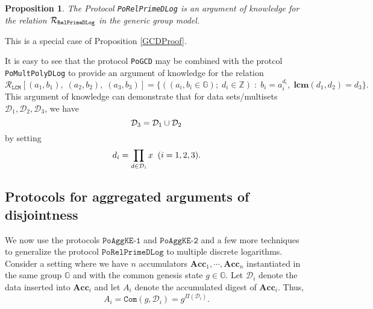 \documentclass[11pt, lettersize, notitlepage, leqno, footskip=0.6cm]{article}
\newcommand{\bz}{\mathbb Z}
\newcommand{\ttt}{\texttt}
\newcommand{\Acc}{\mbf{Acc}}
\newcommand{\mc}{\mathcal}
\newcommand{\mb}{\mathbb}
\newcommand{\mbf}{\mathbf}
\newcommand{\vs}{\vspace{-0.15cm}}
\newcommand{\noin}{\noindent}
\newcommand{\LCM}{\mbf{lcm}}
\newtheorem{Prop}[Thm]{Proposition}
\numberwithin{equation}{section}
\begin{document}
\begin{Prop} The Protocol \verb|PoRelPrimeDLog| is an argument of knowledge for the relation $\mc{R}_{{\tt{RelPrimeDLog}}}$ in the generic group model.\end{Prop}

\begin{prf} This is a special case of Proposition \ref{GCDProof}.\end{prf}



It is easy to see that the protocol \verb|PoGCD| may be combined with the protcol \verb|PoMultPolyDLog| to provide an argument of knowledge for the relation 
\[ \mc{R}_{{\ttt{LCM}}}[(a_1,b_1),\;(a_2,b_2), \; (a_3, b_3)] = \{((a_i, b_i\in\mb{G});\;d_i\in\bz)\;:\; b_i = a_i^{d_i},\;\LCM(d_1,d_2)=d_3 \} .\] This argument of knowledge can demonstrate that for data sets/multisets $\mc{D}_1,\mc{D}_2, \mc{D}_3$, we have \vs $$\mc{D}_3 = \mc{D}_1\cup \mc{D}_2 \vs $$ by setting \vs $$ d_i = \prod\limits_{d\in\mc{D}_i} x\;\;(i=1,2,3). \vs $$







\subsection{\fontsize{11}{11}\selectfont Protocols for aggregated arguments of disjointness}

We now use the protocols \hyperlink{AggKE-1}{$\ttt{PoAggKE-1}$} and \hyperlink{AggKE-2}{$\ttt{PoAggKE-2}$} and a few more techniques to generalize the protocol \hyperlink{RP}{$\ttt{PoRelPrimeDLog}$} to multiple discrete logarithms. Consider a setting where we have $n$ accumulators $\Acc_1,\cdots,\Acc_n$ instantiated in the same group $\mb{G}$ and with the common genesis state $g\in\mb{G}$. Let $\mc{D}_i$ denote the data inserted into $\Acc_i$ and let $A_i$ denote the accumulated digest of $\Acc_i$. Thus, \vs $$A_i = \ttt{Com}(g, \mc{D}_i) =  g^{\Pi(\mc{D}_i)} .$$ 
\end{document}
